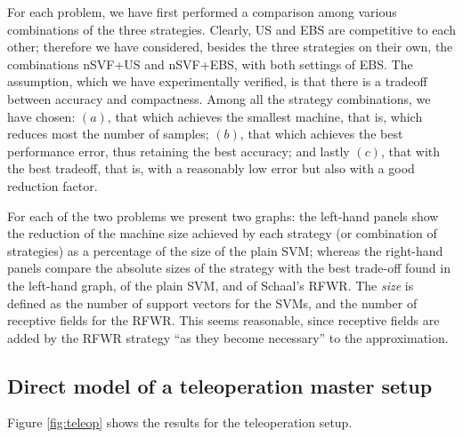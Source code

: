 \documentclass[conference]{IEEEtran}
\begin{document}
For each problem, we have first performed a comparison among various
combinations of the three strategies. Clearly, US and EBS are
competitive to each other; therefore we have considered, besides the
three strategies on their own, the combinations nSVF+US and nSVF+EBS,
with both settings of EBS. The assumption, which we have
experimentally verified, is that there is a tradeoff between accuracy
and compactness. Among all the strategy combinations, we have chosen:
$(a)$, that which achieves the smallest machine, that is, which
reduces most the number of samples; $(b)$, that which achieves the
best performance error, thus retaining the best accuracy; and lastly
$(c)$, that with the best tradeoff, that is, with a reasonably low
error but also with a good reduction factor.

For each of the two problems we present two graphs: the left-hand
panels show the reduction of the machine size achieved by each
strategy (or combination of strategies) as a percentage of the size of
the plain SVM; whereas the right-hand panels compare the absolute
sizes of the strategy with the best trade-off found in the left-hand
graph, of the plain SVM, and of Schaal's RFWR. The \emph{size} is
defined as the number of support vectors for the SVMs, and the number
of receptive fields for the RFWR. This seems reasonable, since
receptive fields are added by the RFWR strategy ``as they become
necessary'' to the approximation.

\subsection{Direct model of a teleoperation master setup}

Figure \ref{fig:teleop} shows the results for the teleoperation
setup.
\end{document}
